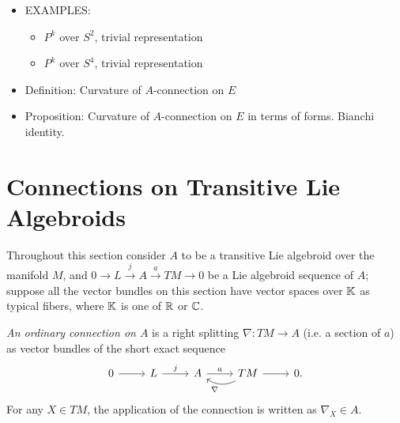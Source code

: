 {\begin{itemize}
\begin{itemize}
        \item EXAMPLES:
        
            \begin{itemize}
                
            \item $P^k$ over $S^2$, trivial representation
            
            \item $P^k$ over $S^4$, trivial representation
            
            \end{itemize}
        
        \item Definition: Curvature of $A$-connection on $E$
        
        \item Proposition: Curvature of $A$-connection on $E$ in terms of forms. Bianchi identity.
            
        \end{itemize}
    
    \end{itemize}
}

\section{Connections on Transitive Lie Algebroids}

Throughout this section consider $A$ to be a transitive Lie algebroid over the manifold $M$, and $0 \to L \xrightarrow{j} A \xrightarrow{a} TM \to 0$ be a Lie algebroid sequence of $A$; suppose all the vector bundles on this section have vector spaces over $\mathbb{K}$ as typical fibers, where $\mathbb{K}$ is one of $\mathbb{R}$ or $\mathbb{C}$.

\begin{definition}
\emph{An ordinary connection on $A$} is a right splitting $\nabla: TM \to A$ (i.e. a section of $a$) as vector bundles of the short exact sequence
\begin{equation}\label{equationDefinitionConnectionRightSplittingNablaSectionAnchorShortExactSequence}
    \begin{tikzcd}
    0 \arrow{r} & L \arrow{r}{j} & A \arrow{r}{a} & TM \arrow{r} \arrow[bend left]{l}{\nabla} & 0.
    \end{tikzcd}
\end{equation}
For any $X \in TM$, the application of the connection is written as $\nabla_X \in A$.
\end{definition}

